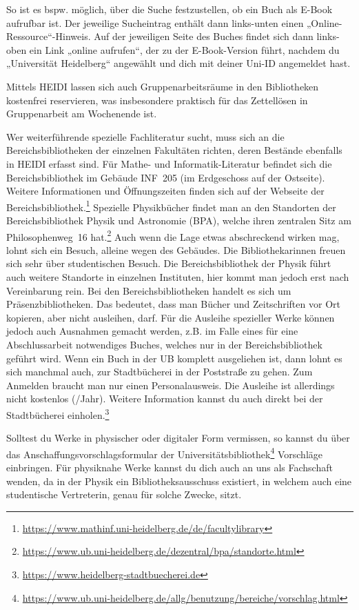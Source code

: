 So ist es bspw. möglich, über die Suche festzustellen, ob ein Buch als E-Book aufrufbar ist. Der jeweilige Sucheintrag enthält dann links-unten einen „Online-Ressource“-Hinweis. Auf der jeweiligen Seite des Buches findet sich dann links-oben ein Link „online aufrufen“, der zu der E-Book-Version führt, nachdem du „Universität Heidelberg“ angewählt und dich mit deiner Uni-ID angemeldet hast.

Mittels HEIDI lassen sich auch Gruppenarbeitsräume in den Bibliotheken kostenfrei reservieren, was insbesondere praktisch für das Zettellösen in Gruppenarbeit am Wochenende ist.

Wer weiterführende spezielle Fachliteratur sucht, muss sich an die Bereichsbibliotheken der einzelnen Fakultäten richten, deren Bestände ebenfalls in \gls{HEIDI} erfasst sind. Für Mathe- und Informatik-Literatur befindet sich die Bereichsbibliothek im Gebäude \gls{INF}~205 (im Erdgeschoss auf der Ostseite). Weitere Informationen und Öffnungszeiten finden sich auf der Webseite der Bereichsbibliothek.\footnote{\url{https://www.mathinf.uni-heidelberg.de/de/facultylibrary}} Spezielle Physikbücher findet man an den Standorten der Bereichsbibliothek Physik und Astronomie (BPA), welche ihren zentralen Sitz am Philosophenweg~16 hat.\footnote{\url{https://www.ub.uni-heidelberg.de/dezentral/bpa/standorte.html}} Auch wenn die Lage etwas abschreckend wirken mag, lohnt sich ein Besuch, alleine wegen des Gebäudes. Die Bibliothekarinnen freuen sich sehr über studentischen Besuch. Die Bereichsbibliothek der Physik führt auch weitere Standorte in einzelnen Instituten, hier kommt man jedoch erst nach Vereinbarung rein.
Bei den Bereichsbibliotheken handelt es sich um Präsenzbibliotheken. Das bedeutet, dass man Bücher und Zeitschriften vor Ort kopieren, aber nicht ausleihen, darf. Für die Ausleihe spezieller Werke können jedoch auch Ausnahmen gemacht werden, z.B. im Falle eines für eine Abschlussarbeit notwendiges Buches, welches nur in der Bereichsbibliothek geführt wird.
Wenn ein Buch in der UB komplett ausgeliehen ist, dann lohnt es sich manchmal auch, zur Stadtbücherei in der Poststraße zu gehen. Zum Anmelden braucht man nur einen Personalausweis. Die Ausleihe ist allerdings nicht kostenlos (/Jahr). Weitere Information kannst du auch direkt bei der Stadtbücherei einholen.\footnote{\url{https://www.heidelberg-stadtbuecherei.de}}

Solltest du Werke in physischer oder digitaler Form vermissen, so kannst du über das Anschaffungsvorschlagsformular der Universitätsbibliothek\footnote{\url{https://www.ub.uni-heidelberg.de/allg/benutzung/bereiche/vorschlag.html}} Vorschläge einbringen. Für physiknahe Werke kannst du dich auch an uns als Fachschaft wenden, da in der Physik ein Bibliotheksausschuss existiert, in welchem auch eine studentische Vertreterin, genau für solche Zwecke, sitzt.

